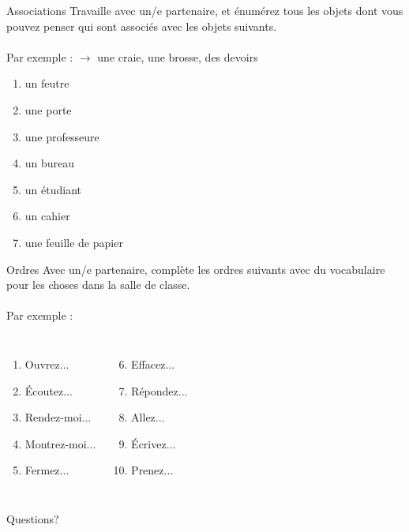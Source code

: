 \documentclass{beamer}
\begin{document}
  \begin{frame}{Associations }
    Travaille avec un/e partenaire, et énumérez tous les objets dont vous pouvez penser qui sont associés avec les objets suivants. \\
     \\
    Par exemple :  $\to$ une craie, une brosse, des devoirs
    \begin{enumerate}
      \item un feutre
      \item une porte
      \item une professeure
      \item un bureau
      \item un étudiant
      \item un cahier
      \item une feuille de papier
    \end{enumerate}
  \end{frame}

  \begin{frame}{Ordres }
    Avec un/e partenaire, complète les ordres suivants avec du vocabulaire pour les choses dans la salle de classe. \\
     \\
    Par exemple : 
    \begin{columns}
        \begin{enumerate}
          \item Ouvrez...
          \item Écoutez...
          \item Rendez-moi...
          \item Montrez-moi...
          \item Fermez...
        \end{enumerate}
        \begin{enumerate}
          \setcounter{enumi}{5}
          \item Effacez...
          \item Répondez...
          \item Allez...
          \item Écrivez...
          \item Prenez...
        \end{enumerate}
    \end{columns}
  \end{frame}

  \begin{frame}{}
    \begin{center}
      \Large Questions?
    \end{center}
  \end{frame}
\end{document}
